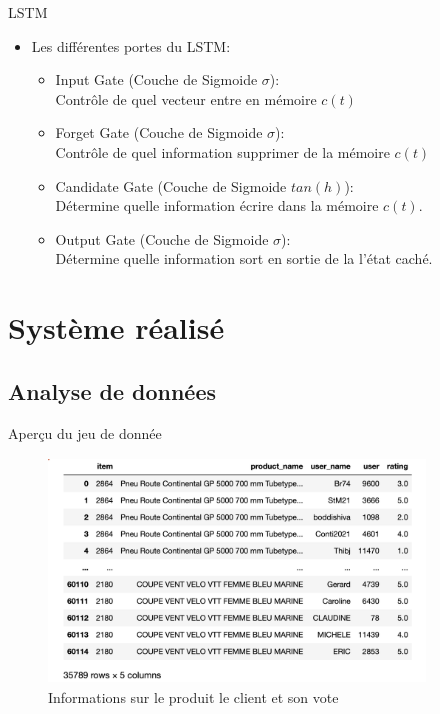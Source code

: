 \documentclass[xelatex,12pt]{beamer}
\begin{document}
\begin{frame}{LSTM}
\begin{itemize}
	\item Les différentes portes du LSTM:\\

	\begin{itemize}
  		\item Input Gate (Couche de Sigmoide $\sigma$):\\
Contrôle de quel vecteur entre en mémoire $c(t)$
\item Forget Gate (Couche de Sigmoide $\sigma$):\\
Contrôle de quel information supprimer de la mémoire $c(t)$
\item Candidate Gate (Couche de Sigmoide $tan(h)$):\\
Détermine quelle information écrire dans la mémoire $c(t)$.
	\item Output Gate (Couche de Sigmoide $\sigma$):\\
Détermine quelle information sort en sortie de la l’état caché. 
	\end{itemize}
\end{itemize}
\end{frame}

\section{Système réalisé}
\subsection{Analyse de données}
\begin{frame}{Aperçu du jeu de donnée}
\begin{figure}[h]
\begin{center}
\includegraphics[width=10cm,height=6cm]{images/model_dataset.png}
\caption[Informations sur le produit le client et son vote]{Informations sur le produit le client et son vote}
\label{monlabel}
\end{center}
\end{figure}
\end{frame}
\end{document}
